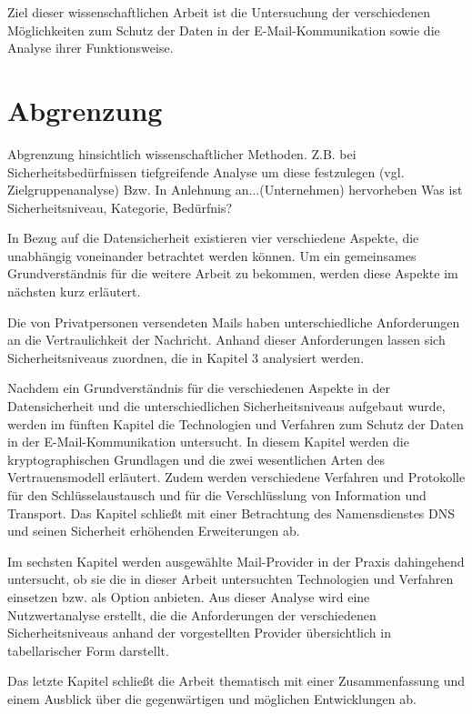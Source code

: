 \documentclass  [paper=a4,
				fontsize=12pt,
				listof=totoc,
				bibliography=totoc
				]{scrreprt}
\begin{document}
		Ziel dieser wissenschaftlichen Arbeit ist die Untersuchung der verschiedenen Möglichkeiten zum Schutz der Daten in der E-Mail-Kommunikation sowie die Analyse ihrer Funktionsweise. 
		
		\section{Abgrenzung}
		\color{darkred}
		Abgrenzung hinsichtlich wissenschaftlicher Methoden.
		Z.B. bei Sicherheitsbedürfnissen tiefgreifende Analyse um diese festzulegen (vgl. Zielgruppenanalyse)
		Bzw. In Anlehnung an...(Unternehmen) hervorheben
		Was ist Sicherheitsniveau, Kategorie, Bedürfnis?
		
		
		In Bezug auf die Datensicherheit existieren vier verschiedene Aspekte, die unabhängig voneinander betrachtet werden können. Um ein gemeinsames Grundverständnis für die weitere Arbeit zu bekommen, werden diese Aspekte im nächsten kurz erläutert.
		
		Die von Privatpersonen versendeten Mails haben unterschiedliche Anforderungen an die Vertraulichkeit der Nachricht. Anhand dieser Anforderungen lassen sich Sicherheitsniveaus zuordnen, die in Kapitel 3 analysiert werden.
		
		Nachdem ein Grundverständnis für die verschiedenen Aspekte in der Datensicherheit und die unterschiedlichen Sicherheitsniveaus aufgebaut wurde, werden im fünften Kapitel die Technologien und Verfahren zum Schutz der Daten in der E-Mail-Kommunikation untersucht. In diesem Kapitel werden die kryptographischen Grundlagen und die zwei wesentlichen Arten des Vertrauensmodell erläutert. Zudem werden verschiedene Verfahren und Protokolle für den Schlüsselaustausch und für die Verschlüsslung von Information und Transport. Das Kapitel schließt mit einer Betrachtung des 
		Namensdienstes DNS und seinen Sicherheit erhöhenden Erweiterungen ab.
		
		Im sechsten Kapitel werden ausgewählte Mail-Provider in der Praxis dahingehend untersucht, ob sie die in dieser Arbeit untersuchten Technologien und Verfahren einsetzen bzw. als Option anbieten. Aus dieser Analyse wird eine Nutzwertanalyse erstellt, die die Anforderungen der verschiedenen Sicherheitsniveaus anhand der vorgestellten Provider übersichtlich in tabellarischer Form darstellt.
		
		Das letzte Kapitel schließt die Arbeit thematisch mit einer Zusammenfassung und einem Ausblick über die gegenwärtigen und möglichen Entwicklungen ab.
		
\end{document}
